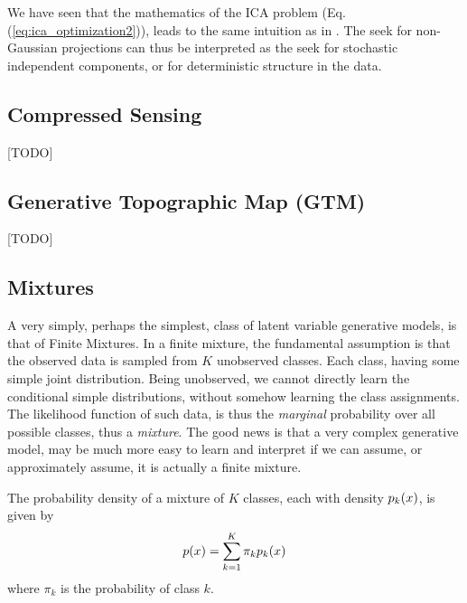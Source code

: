 \begin{remark}
We have seen that the mathematics of the ICA problem (Eq.(\ref{eq:ica_optimization2})), leads to the same intuition as in \cite{friedman_projection_1974}. 
The seek for non-Gaussian projections can thus be interpreted as the seek for stochastic independent components, or for deterministic structure in the data.
\end{remark}




\subsection{Compressed Sensing}
\label{sec:compressed_sensing}
[TODO]





\subsection{Generative Topographic Map (GTM)}
\label{sec:gtm}
[TODO]



\subsection{Mixtures}
A very simply, perhaps the simplest, class of latent variable generative models, is that of Finite Mixtures. 
In a finite mixture, the fundamental assumption is that the observed data is sampled from $K$ unobserved classes. Each class, having some simple joint distribution. 
Being unobserved, we cannot directly learn the conditional simple distributions, without somehow learning the class assignments. 
The likelihood function of such data, is thus the \emph{marginal} probability over all possible classes, thus a \emph{mixture}.
The good news is that a very complex generative model, may be much more easy to learn and interpret if we can assume, or approximately assume, it is actually a finite mixture.

The probability density of a mixture of $K$ classes, each with density $p_k(x)$, is given by  
\begin{align}
\label{eq:mixture}
	p(x)=\sum_{k=1}^{K} \pi_k p_k(x)
\end{align}
where $\pi_k$ is the probability of class $k$.



